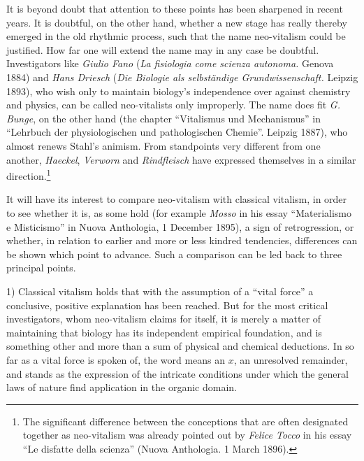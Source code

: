 \documentclass[12pt,a4paper]{article}
\begin{document}
It is beyond doubt that attention to these points has been sharpened in recent
years. It is doubtful, on the other hand, whether a new stage has really thereby
emerged in the old rhythmic process, such that the name neo-vitalism could be
justified. How far one will extend the name may in any case be doubtful.
Investigators like \emph{Giulio Fano} (\textit{La fisiologia come scienza
autonoma.} Genova 1884) and \emph{Hans Driesch} (\textit{Die Biologie als
selbständige Grundwissenschaft.} Leipzig 1893), who wish only to maintain
biology's independence over against chemistry and physics, can be called
neo-vitalists only improperly. The name does fit \emph{G. Bunge}, on the other
hand (the chapter ``Vitalismus und Mechanismus'' in ``Lehrbuch der
physiologischen und pathologischen Chemie''. Leipzig 1887), who almost renews
Stahl's animism. From standpoints very different from one another,
\emph{Haeckel}, \emph{Verworn} and \emph{Rindfleisch} have expressed themselves
in a similar direction.\footnote{The significant difference between the
conceptions that are often designated together as neo-vitalism was already
pointed out by \emph{Felice Tocco} in his essay ``Le disfatte della scienza''
(Nuova Anthologia. 1 March 1896).}

\bigskip

It will have its interest to compare neo-vitalism with classical vitalism, in
order to see whether it is, as some hold (for example \emph{Mosso} in his essay
``Materialismo e Misticismo'' in Nuova Anthologia, 1 December 1895), a sign of
retrogression, or whether, in relation to earlier and more or less kindred
tendencies, differences can be shown which point to advance. Such a comparison
can be led back to three principal points.

1) Classical vitalism holds that with the assumption of a ``vital force'' a
conclusive, positive explanation has been reached. But for the most critical
investigators, whom neo-vitalism claims for itself,
it is merely a matter of maintaining that biology has its independent empirical
foundation, and is something other and more than a sum of physical and chemical
deductions. In so far as a vital force is spoken of, the word means an $x$, an
unresolved remainder, and stands as the expression of the intricate conditions
under which the general laws of nature find application in the organic domain.
\end{document}
